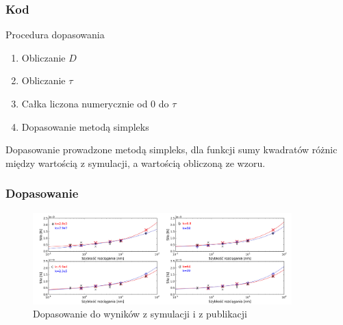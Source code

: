 \documentclass[10pt]{beamer}
\begin{document}
\begin{frame}
\frametitle{Kod}

\begin{block}{Procedura dopasowania}
\begin{enumerate}
\item Obliczanie $D$
\item Obliczanie $\tau$
\item Całka liczona numerycznie od 0 do $\tau$
\item Dopasowanie metodą simpleks
\end{enumerate}
\end{block}

Dopasowanie prowadzone metodą simpleks, dla funkcji sumy kwadratów różnic między wartością z symulacji, a wartością obliczoną ze wzoru.

\end{frame}


\begin{frame}
\frametitle{Dopasowanie}
\begin{center}
\begin{figure}[h]
\begin{centering}
\includegraphics[width=100mm]{./poster/anal.png}
\caption{Dopasowanie do wyników z symulacji i z publikacji}
\end{centering}
\end{figure}

\end{center}
\end{frame}
\end{document}
